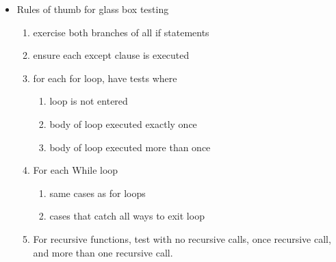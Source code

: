 \documentclass[11pt]{article}
\begin{document}
\begin{enumerate}
\begin{itemize}
\begin{enumerate}
            \end{enumerate}
            \item Rules of thumb for glass box testing
            \begin{enumerate}
                \item exercise both branches of all if statements
                \item ensure each except clause is executed
                \item for each for loop, have tests where
                \begin{enumerate}
                    \item loop is not entered
                    \item body of loop executed exactly once
                    \item body of loop executed more than once
                \end{enumerate}
                \item For each While loop
                \begin{enumerate}
                    \item same cases as for loops
                    \item cases that catch all ways to exit loop
                \end{enumerate}
                \item For recursive functions, test with no recursive calls, once recursive call, and more than one recursive call.
            \end{enumerate}
        \end{itemize}
    \end{enumerate}
\end{document}
